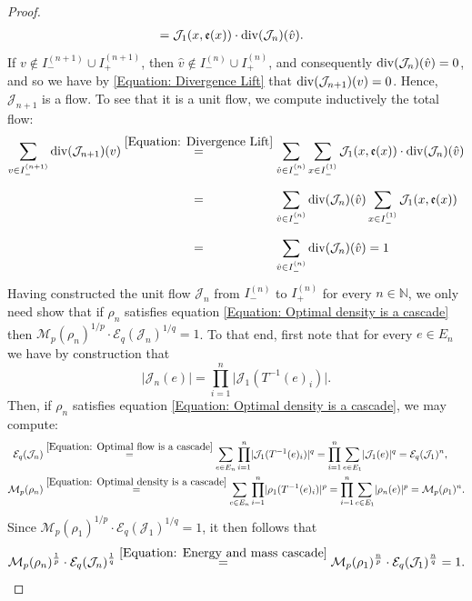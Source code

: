 \documentclass{amsart}
\newcommand{\divr}{{\rm div}}
\numberwithin{equation}{section}
\theoremstyle{definition}
\theoremstyle{remark}
\newcommand{\N}{\mathbb{N}}
\newcommand{\cE}{\mathcal{E}}
\newcommand{\cJ}{\mathcal{J}}
\newcommand{\cM}{\mathcal{M}}
\begin{document}
\begin{proof}
\begin{equation}
\begin{split}
        &=\cJ_1(x,\mathfrak{e}(x))\cdot\divr(\cJ_n)(\hat{v}).
    \end{split}
    \end{equation}
    If \(v\not\in I_-^{(n+1)}\cup I_+^{(n+1)}\), then \(\hat{v}\not\in I_-^{(n)}\cup I_+^{(n)}\), and consequently \(\divr(\cJ_n)(\hat{v})=0\), and so we have by \eqref{Equation: Divergence Lift} that \(\divr(\cJ_{n+1})(v)=0\). Hence, \(\cJ_{n+1}\) is a flow. To see that it is a unit flow, we compute inductively the total flow:
    \[
    \begin{split}
        \sum_{v\in I_-^{(n+1)}}\divr(\cJ_{n+1})(v)&\stackrel{\eqref{Equation: Divergence Lift}}{=}\sum_{\hat{v}\in I_-^{(n)}}\sum_{x\in I_-^{(1)}}\cJ_1(x,\mathfrak{e}(x))\cdot \divr(\cJ_n)(\hat{v})\\
        &\stackrel{\phantom{\eqref{Equation: Divergence Lift}}}{=}\sum_{\hat{v}\in I_-^{(n)}}\divr(\cJ_n)(\hat{v})\sum_{x\in I_-^{(1)}}\cJ_1(x,\mathfrak{e}(x))\\
        &\stackrel{\phantom{\eqref{Equation: Divergence Lift}}}{=}\sum_{\hat{v}\in I_-^{(n)}}\divr(\cJ_n)(\hat{v})=1
    \end{split}
    \]
    Having constructed the unit flow \(\cJ_n\) from \(I^{(n)}_-\) to \(I^{(n)}_+\) for every \(n\in\N\), we only need show that if \(\rho_n\) satisfies equation \eqref{Equation: Optimal density is a cascade} then \(\cM_p(\rho_n)^{1/p} \cdot \cE_q(\cJ_n)^{1/q}=1\). To that end, first note that for every \(e\in E_{n}\) we have by construction that
    \begin{equation}\label{Equation: Optimal flow is a cascade}
        \lvert \cJ_{n}(e)\rvert=\prod_{i=1}^{n}\lvert \cJ_1(T^{-1}(e)_i)\rvert.
    \end{equation}
    Then, if \(\rho_n\) satisfies equation \eqref{Equation: Optimal density is a cascade}, we may compute:
    \begin{equation}\label{Equation: Energy and mass cascade}
    \begin{split}
        \cE_q(\cJ_n)&\stackrel{\eqref{Equation: Optimal flow is a cascade}}{=}\sum_{e\in E_n}\prod_{i=1}^{n}\lvert \cJ_1(T^{-1}(e)_i)\rvert^q=\prod_{i=1}^{n}\sum_{e\in E_1}\lvert\cJ_1(e)\rvert^q=\cE_q(\cJ_1)^n,\\
        \cM_p(\rho_n)&\stackrel{\eqref{Equation: Optimal density is a cascade}}{=}\sum_{e\in E_n}\prod_{i=1}^n\lvert \rho_1(T^{-1}(e)_i)\rvert^p=\prod_{i=1}^n\sum_{e\in E_1}\lvert\rho_n(e)\rvert^p=\cM_p(\rho_1)^n.
    \end{split}
    \end{equation}
    Since \(\cM_p(\rho_1)^{1/p} \cdot \cE_q(\cJ_1)^{1/q}=1\), it then follows that
    \[
        \cM_p(\rho_n)^\frac{1}{p}\cdot \cE_q(\cJ_n)^\frac{1}{q}\stackrel{\eqref{Equation: Energy and mass cascade}}{=}\cM_p(\rho_1)^\frac{n}{p}\cdot \cE_q(\cJ_1)^\frac{n}{q}=1.
    \]  
\end{proof}
\end{document}
